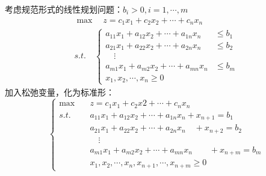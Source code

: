 \documentclass{book}
\begin{document}
考虑规范形式的线性规划问题：$b_i>0,i=1,\cdots,m$
$$
    \begin{aligned}
         & \max\quad z=c_1x_1+c_2x_2+\cdots+c_nx_n & \\
         & s.t.\quad
        \begin{cases}
            a_{11}x_1+a_{12}x_2+\cdots+a_{1n}x_n & \le b_1 \\
            a_{21}x_1+a_{22}x_2+\cdots+a_{2n}x_n & \le b_2 \\
            \quad\vdots                                    \\
            a_{m1}x_1+a_{m2}x_2+\cdots+a_{mn}x_n & \le b_m \\
            x_1,x_2,\cdots,x_n\ge0
        \end{cases}
    \end{aligned}
$$
加入松弛变量，化为标准形：
\begin{equation}
    \begin{cases}
        \max\quad & z=c_1x_1+c_2x2+\cdots+c_nx_n                                \\
        s.t.\quad & a_{11}x_1+a_{12}x_2+\cdots+a_{1n}x_n +x_{n+1}=b_1           \\
                  & a_{21}x_1+a_{22}x_2+\cdots+a_{2n}x_n \quad+x_{n+2}=b_2      \\
                  & \quad\vdots                                                 \\
                  & a_{m1}x_1+a_{m2}x_2+\cdots+a_{mn}x_n \quad\quad+x_{n+m}=b_m \\
                  & x_1,x_2,\cdots,x_n,x_{n+1},\cdots,x_{n+m}\ge0
    \end{cases}
    \label{con: eq2.2}
\end{equation}
\end{document}
